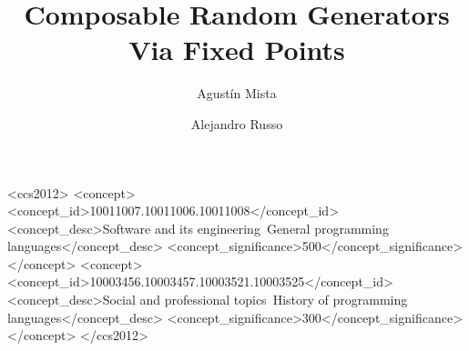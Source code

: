 \documentclass[sigplan,review,anonymous]{acmart}
\begin{document}
\title{Composable Random Generators Via Fixed Points}



\author{Agust\'in Mista}

\author{Alejandro Russo}



\begin{abstract}
\end{abstract}


\begin{CCSXML}
<ccs2012>
<concept>
<concept_id>10011007.10011006.10011008</concept_id>
<concept_desc>Software and its engineering~General programming languages</concept_desc>
<concept_significance>500</concept_significance>
</concept>
<concept>
<concept_id>10003456.10003457.10003521.10003525</concept_id>
<concept_desc>Social and professional topics~History of programming languages</concept_desc>
<concept_significance>300</concept_significance>
</concept>
</ccs2012>
\end{CCSXML}


\end{document}
